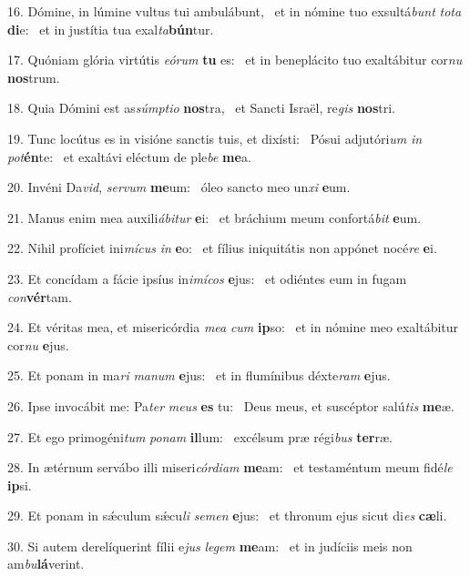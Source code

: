 16. Dómine, in lúmine vultus tui ambulábunt, \dag\  et in nómine tuo exsultá\textit{bunt} \textit{to}\textit{ta} \textbf{di}e: \ast\  et in justítia tua exal\textit{ta}\textbf{bún}tur.\

17. Quóniam glória virtútis \textit{e}\textit{ó}\textit{rum} \textbf{tu} es: \ast\  et in beneplácito tuo exaltábitur cor\textit{nu} \textbf{nos}trum.\

18. Quia Dómini est as\textit{súmp}\textit{ti}\textit{o} \textbf{nos}tra, \ast\  et Sancti Israël, re\textit{gis} \textbf{nos}tri.\

19. Tunc locútus es in visióne sanctis tuis, et dixísti: \dag\  Pósui adjutóri\textit{um} \textit{in} \textit{pot}\textbf{én}te: \ast\  et exaltávi eléctum de ple\textit{be} \textbf{me}a.\

20. Invéni Da\textit{vid}, \textit{ser}\textit{vum} \textbf{me}um: \ast\  óleo sancto meo un\textit{xi} \textbf{e}um.\

21. Manus enim mea auxili\textit{á}\textit{bi}\textit{tur} \textbf{e}i: \ast\  et bráchium meum confortá\textit{bit} \textbf{e}um.\

22. Nihil profíciet ini\textit{mí}\textit{cus} \textit{in} \textbf{e}o: \ast\  et fílius iniquitátis non appónet nocé\textit{re} \textbf{e}i.\

23. Et concídam a fácie ipsíus in\textit{i}\textit{mí}\textit{cos} \textbf{e}jus: \ast\  et odiéntes eum in fugam \textit{con}\textbf{vér}tam.\

24. Et véritas mea, et misericórdia \textit{me}\textit{a} \textit{cum} \textbf{ip}so: \ast\  et in nómine meo exaltábitur cor\textit{nu} \textbf{e}jus.\

25. Et ponam in ma\textit{ri} \textit{ma}\textit{num} \textbf{e}jus: \ast\  et in flumínibus déxte\textit{ram} \textbf{e}jus.\

26. Ipse invocábit me: Pa\textit{ter} \textit{me}\textit{us} \textbf{es} tu: \ast\  Deus meus, et suscéptor salú\textit{tis} \textbf{me}æ.\

27. Et ego primogéni\textit{tum} \textit{po}\textit{nam} \textbf{il}lum: \ast\  excélsum præ régi\textit{bus} \textbf{ter}ræ.\

28. In ætérnum servábo illi miseri\textit{cór}\textit{di}\textit{am} \textbf{me}am: \ast\  et testaméntum meum fidé\textit{le} \textbf{ip}si.\

29. Et ponam in sǽculum sǽcu\textit{li} \textit{se}\textit{men} \textbf{e}jus: \ast\  et thronum ejus sicut di\textit{es} \textbf{cæ}li.\

30. Si autem derelíquerint fílii e\textit{jus} \textit{le}\textit{gem} \textbf{me}am: \ast\  et in judíciis meis non am\textit{bu}\textbf{lá}verint.\


